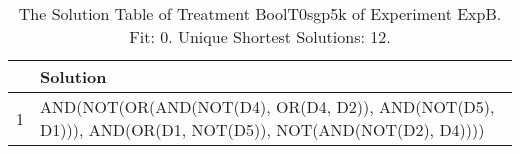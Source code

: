 \begin{table}[ht]
\centering
\begin{tabular}{rp{9cm}}
  \hline
 & Solution \\ 
  \hline
1 & AND(NOT(OR(AND(NOT(D4), OR(D4, D2)), AND(NOT(D5), D1))), AND(OR(D1, NOT(D5)), NOT(AND(NOT(D2), D4)))) \\ 
   \hline
\end{tabular}
\caption{The Solution Table of Treatment BoolT0sgp5k of Experiment ExpB. Fit: 0. Unique Shortest Solutions: 12.} 
\end{table}
